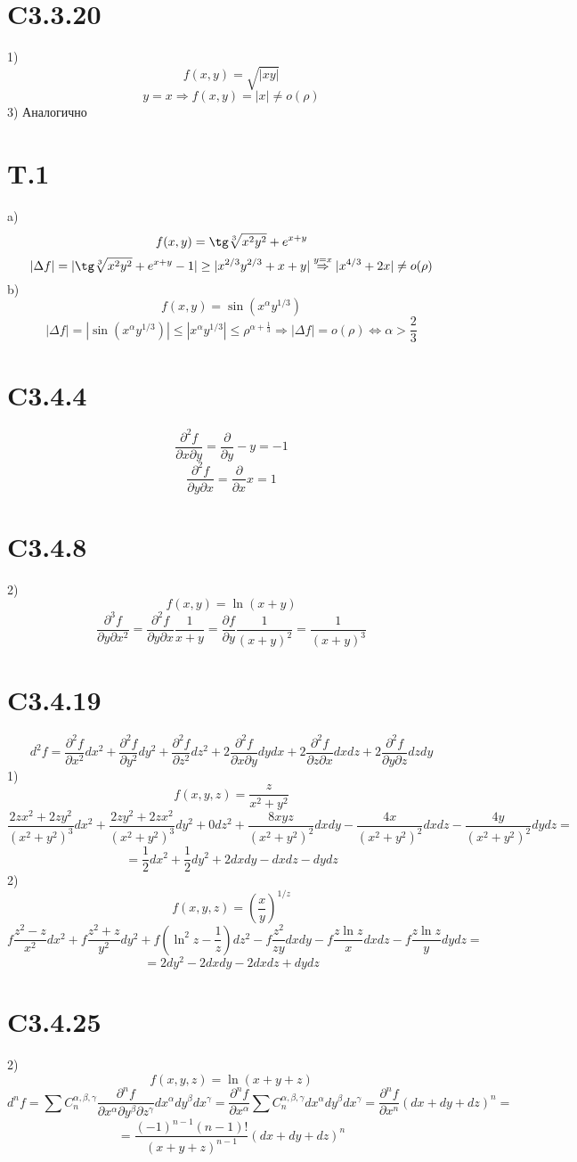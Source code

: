 \documentclass[a4paper,12pt]{article} %
\begin{document}
\section*{C3.3.20}1)$$f(x,y)=\sqrt{|xy|}$$
$$y=x\Rightarrow f(x,y)=|x|\ne o(\rho)$$
3) Аналогично
\section*{T.1}a)$$f(x,y)=\tg\sqrt[3]{x^2y^2}+e^{x+y}$$
$$|\Delta f|=|\tg\sqrt[3]{x^2y^2}+e^{x+y}-1|\ge|x^{2/3}y^{2/3}+x+y|\overset{y=x}{\Rightarrow}|x^{4/3}+2x|\ne o(\rho)$$
b) $$f(x,y)=\sin(x^{\alpha}y^{1/3})$$
$$|\Delta f|=|\sin(x^{\alpha}y^{1/3})|\le|x^{\alpha}y^{1/3}|\le\rho^{\alpha+\frac{1}{3}}\Rightarrow |\Delta f|=o(\rho)\Leftrightarrow\alpha>\frac{2}{3}$$
\section*{C3.4.4}$$\frac{\partial^2 f}{\partial x\partial y}=\frac{\partial}{\partial y}-y=-1$$
$$\frac{\partial^2 f}{\partial y\partial x}=\frac{\partial}{\partial x}x=1$$
\section*{C3.4.8}2)$$f(x,y)=\ln(x+y)$$
$$\frac{\partial^3 f}{\partial y\partial x^2}=\frac{\partial^2 f}{\partial y\partial x}\frac{1}{x+y}=\frac{\partial f}{\partial y}\frac{1}{(x+y)^2}=\frac{1}{(x+y)^3}$$
\section*{C3.4.19}$$d^2f=\frac{\partial^2f}{\partial x^2}dx^2+\frac{\partial^2f}{\partial y^2}dy^2+\frac{\partial^2f}{\partial z^2}dz^2+2\frac{\partial^2f}{\partial x\partial y}dydx+2\frac{\partial^2f}{\partial z\partial x}dxdz+2\frac{\partial^2f}{\partial y\partial z}dzdy$$1)$$f(x,y,z)=\frac{z}{x^2+y^2}$$
$$\frac{2zx^2+2zy^2}{(x^2+y^2)^3}dx^2+\frac{2zy^2+2zx^2}{(x^2+y^2)^3}dy^2+0dz^2+\frac{8xyz}{(x^2+y^2)^2}dxdy-\frac{4x}{(x^2+y^2)^2}dxdz-\frac{4y}{(x^2+y^2)^2}dydz=$$
$$=\frac{1}{2}dx^2+\frac{1}{2}dy^2+2dxdy-dxdz-dydz$$
2)$$f(x,y,z)=\left(\frac{x}{y}\right)^{1/z}$$
$$f\frac{z^2-z}{x^2}dx^2+f\frac{z^2+z}{y^2}dy^2+f\left(\ln^2z-\frac{1}{z}\right)dz^2-f\frac{z^2}{zy}dxdy-f\frac{z\ln z}{x}dxdz-f\frac{z\ln z}{y}dydz=$$
$$=2dy^2-2dxdy-2dxdz+dydz$$
\section*{C3.4.25}2) $$f(x,y,z)=\ln (x+y+z)$$
$$d^nf=\sum C^{\alpha,\beta,\gamma}_{n}\frac{\partial^nf}{\partial x^{\alpha}\partial y^{\beta}\partial z^{\gamma}}dx^{\alpha}dy^{\beta}dx^{\gamma}=\frac{\partial^nf}{\partial x^{\alpha}}\sum C^{\alpha,\beta,\gamma}_{n}dx^{\alpha}dy^{\beta}dx^{\gamma}=\frac{\partial^nf}{\partial x^n}(dx+dy+dz)^{n}=$$
$$=\frac{(-1)^{n-1}(n-1)!}{(x+y+z)^{n-1}}(dx+dy+dz)^{n}$$
\end{document}
